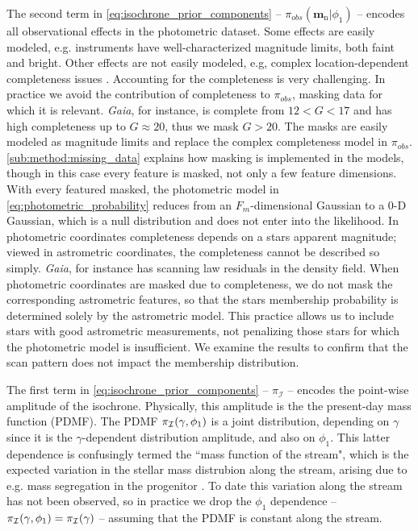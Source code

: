 \documentclass[twocolumn, linenumbers]{aastex631}
\newcommand{\dataarchive}[1]{\textit{#1}}
\newcommand{\Gaia}{\dataarchive{Gaia}}
\newcommand{\mrm}[1]{\mathrm{#1}}
\newcommand{\mbs}[1]{\boldsymbol{#1}}
\newcommand{\mcal}[1]{\mathcal{#1}}
\newcommand{\prior}{\mcal{\pi}}
\newcommand{\nth}[1]{{#1}_{\mrm{n}}}  %
\begin{document}
            The second term in \autoref{eq:isochrone_prior_components} --
            $\prior_{obs}(\nth{\mbs{m}} | \phi_1)$ -- encodes all observational
            effects in the photometric dataset. Some effects are easily modeled,
            e.g. instruments have well-characterized magnitude limits, both
            faint and bright. Other effects are not easily modeled, e.g, complex
            location-dependent completeness issues \citep{GaiaCompleteness}.
            Accounting for the completeness is very challenging. In practice we
            avoid the contribution of completeness to $\prior_{obs}$, masking
            data for which it is relevant. \Gaia, for instance, is complete from
            $12 < G < 17$ and has high completeness up to $G \approx 20$, thus
            we mask $G > 20$.  The masks are easily modeled as magnitude limits
            and replace the complex completeness model in $\prior_{obs}$.
            \autoref{sub:method:missing_data} explains how masking is
            implemented in the models, though in this case every feature is
            masked, not only a few feature dimensions. With every featured
            masked, the photometric model in
            \autoref{eq:photometric_probability} reduces from an
            $F_m$-dimensional Gaussian to a 0-D Gaussian, which is a null
            distribution and does not enter into the likelihood.  In photometric
            coordinates completeness depends on a stars apparent magnitude;
            viewed in astrometric coordinates, the completeness cannot be
            described so simply. \Gaia, for instance has scanning law residuals
            in the density field. When photometric coordinates are masked due to
            completeness, we do not mask the corresponding  astrometric
            features, so that the stars membership probability is determined
            solely by the astrometric model. This practice allows us to include
            stars with good astrometric measurements, not penalizing those stars
            for which the photometric model is insufficient.  We examine the
            results to confirm that the scan pattern does not impact the
            membership distribution.

            The first term in \autoref{eq:isochrone_prior_components} --
            $\prior_{\mcal{I}}$ -- encodes the point-wise amplitude of the
            isochrone.  Physically, this amplitude is the the present-day mass
            function (PDMF). The PDMF $\prior_{\cal{I}}(\gamma, \phi_1)$ is a
            joint distribution, depending on $\gamma$ since it is the
            $\gamma$-dependent distribution amplitude, and also on $\phi_1$.
            This latter dependence is confusingly termed the ``mass function of
            the stream", which is the expected variation in the stellar mass
            distrubion along the stream, arising due to e.g. mass segregation in
            the progenitor \citep{WebbBovy2022}. To date this variation along
            the stream has not been observed, so in practice we drop the
            $\phi_1$ dependence -- $\prior_{\cal{I}}(\gamma, \phi_1) =
            \prior_{\cal{I}}(\gamma)$ -- assuming that the PDMF is constant
            along the stream.
\end{document}
